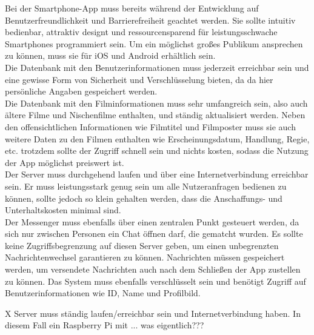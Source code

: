 \noindent
Bei der Smartphone-App muss bereits während der Entwicklung auf Benutzerfreundlichkeit und Barrierefreiheit geachtet werden. Sie sollte intuitiv bedienbar, attraktiv designt und ressourcensparend für leistungsschwache Smartphones programmiert sein. Um ein möglichst großes Publikum ansprechen zu können, muss sie für iOS und Android erhältlich sein.\\
Die Datenbank mit den Benutzerinformationen muss jederzeit erreichbar sein und eine gewisse Form von Sicherheit und Verschlüsselung bieten, da da hier persönliche Angaben gespeichert werden.\\
Die Datenbank mit den Filminformationen  muss sehr umfangreich sein, also auch ältere Filme und Nischenfilme enthalten, und ständig aktualisiert werden. Neben den offensichtlichen Informationen wie Filmtitel und Filmposter muss sie auch weitere Daten zu den Filmen enthalten wie Erscheinungsdatum, Handlung, Regie, etc. trotzdem sollte der Zugriff schnell sein und nichts kosten, sodass die Nutzung der App möglichst preiswert ist.\\
Der Server muss durchgehend laufen und über eine Internetverbindung erreichbar sein. Er muss leistungsstark genug sein um alle Nutzeranfragen bedienen zu können, sollte jedoch so klein gehalten werden, dass die Anschaffungs- und Unterhaltskosten minimal sind.\\
Der Messenger  muss ebenfalls über einen zentralen Punkt gesteuert werden, da sich nur zwischen Personen ein Chat öffnen darf, die gematcht wurden. Es sollte keine Zugriffsbegrenzung auf diesen Server  geben, um einen unbegrenzten  Nachrichtenwechsel garantieren zu können. Nachrichten müssen gespeichert werden, um versendete Nachrichten auch nach dem Schließen der App zustellen zu können. Das System muss ebenfalls verschlüsselt sein und benötigt Zugriff auf Benutzerinformationen wie ID, Name und Profilbild.



X Server muss ständig laufen/erreichbar sein und Internetverbindung haben. In diesem Fall ein Raspberry Pi mit ... was eigentlich??? \\ %



